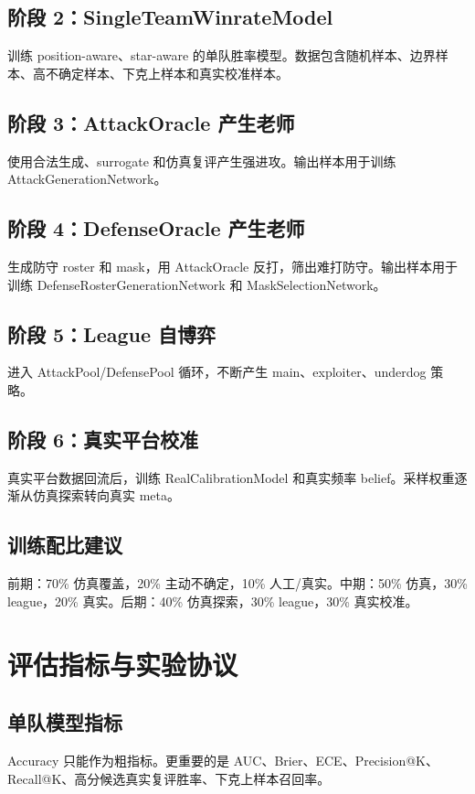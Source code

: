 \documentclass[UTF8,12pt,openany]{ctexbook}
\begin{document}
\section{阶段 2：SingleTeamWinrateModel}
训练 position-aware、star-aware 的单队胜率模型。数据包含随机样本、边界样本、高不确定样本、下克上样本和真实校准样本。

\section{阶段 3：AttackOracle 产生老师}
使用合法生成、surrogate 和仿真复评产生强进攻。输出样本用于训练 AttackGenerationNetwork。

\section{阶段 4：DefenseOracle 产生老师}
生成防守 roster 和 mask，用 AttackOracle 反打，筛出难打防守。输出样本用于训练 DefenseRosterGenerationNetwork 和 MaskSelectionNetwork。

\section{阶段 5：League 自博弈}
进入 AttackPool/DefensePool 循环，不断产生 main、exploiter、underdog 策略。

\section{阶段 6：真实平台校准}
真实平台数据回流后，训练 RealCalibrationModel 和真实频率 belief。采样权重逐渐从仿真探索转向真实 meta。

\section{训练配比建议}
前期：70\% 仿真覆盖，20\% 主动不确定，10\% 人工/真实。中期：50\% 仿真，30\% league，20\% 真实。后期：40\% 仿真探索，30\% league，30\% 真实校准。


\chapter{评估指标与实验协议}

\section{单队模型指标}
Accuracy 只能作为粗指标。更重要的是 AUC、Brier、ECE、Precision@K、Recall@K、高分候选真实复评胜率、下克上样本召回率。
\end{document}
